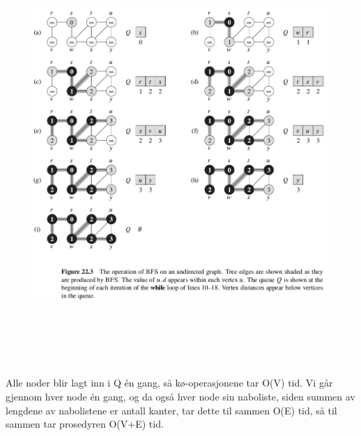 \documentclass[12pt]{report}
\begin{document}
\vspace{\baselineskip}



\begin{figure}[H]
	\begin{Center}
		\includegraphics[width=6.27in,height=6.28in]{./media/image98.png}
	\end{Center}
\end{figure}



\par


\vspace{\baselineskip}
Alle noder blir lagt inn i Q én gang, så kø-operasjonene tar O(V) tid. Vi går gjennom hver node én gang, og da også hver node sin naboliste, siden summen av lengdene av nabolistene er antall kanter, tar dette til sammen O(E) tid, så til sammen tar prosedyren O(V+E) tid. \par
\end{document}
